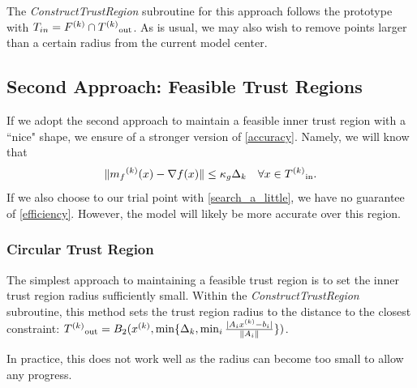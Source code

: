 The \emph{ConstructTrustRegion} subroutine for this approach follows the prototype with $T_{in} = {F}^{(k)} \cap {T^{(k)}}_{\text{out}} $.
As is usual, we may also wish to remove points larger than a certain radius from the current model center.






\subsection{Second Approach: Feasible Trust Regions}

If we adopt the second approach to maintain a feasible inner trust region with a ``nice" shape, we ensure of a stronger version of \cref{accuracy}.
Namely, we will know that 
\[
    \|{{m}_f}^{(k)}(x) - \nabla f(x) \| \le \kappa_g \Delta_{k} \quad \forall x \in {T^{(k)}}_{\text{in}}.
\]
If we also choose to our trial point with \cref{search_a_little}, we have no guarantee of \cref{efficiency}.
However, the model will likely be more accurate over this region.


\subsubsection{Circular Trust Region}
The simplest approach to maintaining a feasible trust region is to set the inner trust region radius sufficiently small.
Within the \emph{ConstructTrustRegion} subroutine, this method sets the trust region radius to the distance to the closest constraint:
${T^{(k)}}_{\text{out}} = B_2({x}^{(k)}, \min\{\Delta_k, \min_{i}\frac{|A_i{x}^{(k)} - b_i|}{\|A_i\|} \})$.

In practice, this does not work well as the radius can become too small to allow any progress.

